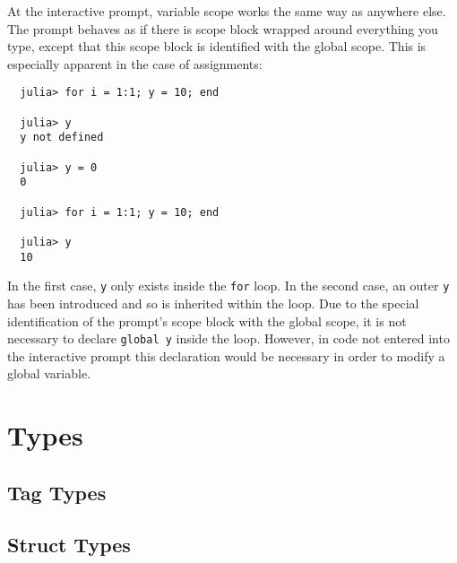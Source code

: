 \documentclass{article}
\renewcommand{\sec}[1]{\label{sec:#1}}
\begin{document}
At the interactive prompt, variable scope works the same way as anywhere
else. The prompt behaves as if there is scope block wrapped around everything
you type, except that this scope block is identified with the global scope.
This is especially apparent in the case of assignments:
\begin{verbatim}
  julia> for i = 1:1; y = 10; end
  
  julia> y
  y not defined
  
  julia> y = 0
  0
  
  julia> for i = 1:1; y = 10; end
  
  julia> y
  10
\end{verbatim}
In the first case, \verb|y| only exists inside the \verb|for| loop.
In the second case, an outer \verb|y| has been introduced and so is inherited
within the loop. Due to the special identification of the prompt's scope
block with the global scope, it is not necessary to declare
\verb|global y| inside the loop. However, in code not entered into the interactive prompt
this declaration would be necessary in order to modify a global variable.

\section{Types}\sec{types}

\subsection{Tag Types}
\subsection{Struct Types}
\end{document}
